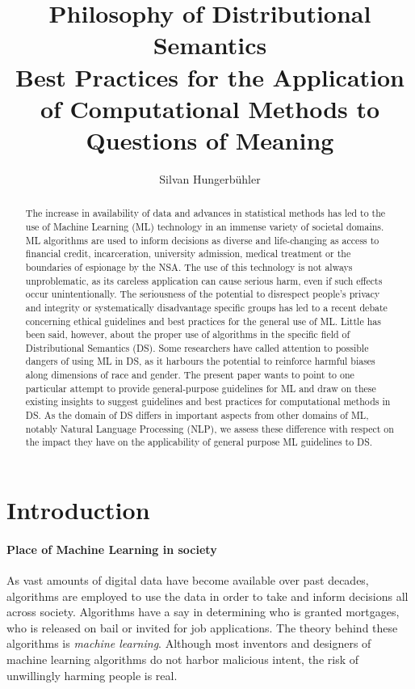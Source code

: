 \documentclass{article}
\title{Philosophy of Distributional Semantics\\
\large Best Practices for the Application of Computational Methods to Questions of Meaning}
\date{}
\author{Silvan Hungerb{\"u}hler}
\begin{document}
\maketitle
\begin{abstract}
The increase in availability of data and advances in statistical methods has led to the use of Machine Learning (ML) technology in an immense variety of societal domains. ML algorithms are used to inform decisions as diverse and life-changing as access to financial credit, incarceration, university admission, medical treatment or the boundaries of espionage by the NSA.
The use of this technology is not always unproblematic, as its careless application can cause serious harm, even if such effects occur unintentionally.
The seriousness of the potential to disrespect people's privacy and integrity or systematically disadvantage specific groups has led to a recent debate concerning ethical guidelines and best practices for the general use of ML.
Little has been said, however, about the proper use of algorithms in the specific field of Distributional Semantics (DS). Some researchers have called attention to possible dangers of using ML in DS, as it harbours the potential to reinforce harmful biases along dimensions of race and gender.
The present paper wants to point to one particular attempt to provide general-purpose guidelines for ML and draw on these existing insights to suggest guidelines and best practices for computational methods in DS.
As the domain of DS differs in important aspects from other domains of ML, notably Natural Language Processing (NLP),
we assess these difference with respect on the impact they have on the applicability of general purpose ML guidelines to DS.
\end{abstract}
\section{Introduction}
\paragraph{Place of Machine Learning in society}
As vast amounts of digital data have become available over past decades, algorithms are employed to use the data in order to take and inform decisions all across society. 
Algorithms have a say in determining who is granted mortgages, who is released on bail or invited for job applications. 
\cite{algorithms2016}
The theory behind these algorithms is \emph{machine learning}.
Although most inventors and designers of machine learning algorithms do not harbor malicious intent, the risk of unwillingly harming people is real.
\end{document}
